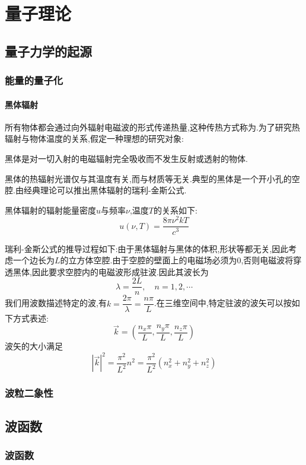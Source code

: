 \documentclass{ctexbook}
\begin{document}
\chapter{量子理论}
\section{量子力学的起源}
\subsection{能量的量子化}
\subsubsection{黑体辐射}
所有物体都会通过向外辐射电磁波的形式传递热量,这种传热方式称为.为了研究热辐射与物体温度的关系,假定一种理想的研究对象:
\begin{definition}[黑体]
    黑体是对一切入射的电磁辐射完全吸收而不发生反射或透射的物体.
\end{definition}
黑体的热辐射光谱仅与其温度有关,而与材质等无关.典型的黑体是一个开小孔的空腔.由经典理论可以推出黑体辐射的瑞利-金斯公式.
\begin{theorem}[瑞利-金斯公式]
    黑体辐射的辐射能量密度$u$与频率$\nu$,温度$T$的关系如下:
    \[u(\nu,T)=\dfrac{8\pi\nu^2kT}{c^3}\]
\end{theorem}
瑞利-金斯公式的推导过程如下:由于黑体辐射与黑体的体积,形状等都无关,因此考虑一个边长为$L$的立方体空腔.由于空腔的壁面上的电磁场必须为$0$,否则电磁波将穿透黑体,因此要求空腔内的电磁波形成驻波.因此其波长为
\[\lambda=\dfrac{2L}{n},\quad n=1,2,\cdots\]
我们用波数描述特定的波,有$k=\dfrac{2\pi}{\lambda}=\dfrac{n\pi}{L}$.在三维空间中,特定驻波的波矢可以按如下方式表述:
\[\vec{k}=\left(\dfrac{n_x\pi}{L},\dfrac{n_y\pi}{L},\dfrac{n_z\pi}{L}\right)\]
波矢的大小满足
\[\left|\vec{k}\right|^2=\dfrac{\pi^2}{L^2}n^2=\dfrac{\pi^2}{L^2}\left(n_x^2+n_y^2+n_z^2\right)\]
\subsection{波粒二象性}
\subsubsection{}
\section{波函数}
\subsection{波函数}
\end{document}
